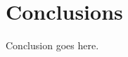 \documentclass{sig-alternate-ipsn13}
\begin{document}


\section{Conclusions}
Conclusion goes here.


%

%
%


\end{document}
